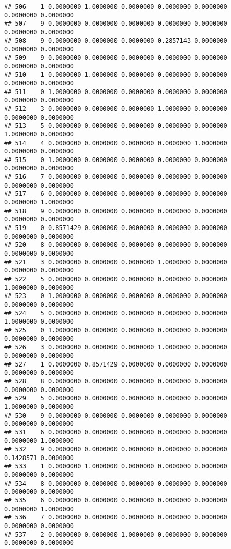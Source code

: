 \documentclass[
]{article}
\begin{document}
\begin{verbatim}
## 506    1 0.0000000 1.0000000 0.0000000 0.0000000 0.0000000 0.0000000 0.0000000
## 507    9 0.0000000 0.0000000 0.0000000 0.0000000 0.0000000 0.0000000 0.0000000
## 508    9 0.0000000 0.0000000 0.0000000 0.2857143 0.0000000 0.0000000 0.0000000
## 509    9 0.0000000 0.0000000 0.0000000 0.0000000 0.0000000 0.0000000 0.0000000
## 510    1 0.0000000 1.0000000 0.0000000 0.0000000 0.0000000 0.0000000 0.0000000
## 511    0 1.0000000 0.0000000 0.0000000 0.0000000 0.0000000 0.0000000 0.0000000
## 512    3 0.0000000 0.0000000 0.0000000 1.0000000 0.0000000 0.0000000 0.0000000
## 513    5 0.0000000 0.0000000 0.0000000 0.0000000 0.0000000 1.0000000 0.0000000
## 514    4 0.0000000 0.0000000 0.0000000 0.0000000 1.0000000 0.0000000 0.0000000
## 515    0 1.0000000 0.0000000 0.0000000 0.0000000 0.0000000 0.0000000 0.0000000
## 516    7 0.0000000 0.0000000 0.0000000 0.0000000 0.0000000 0.0000000 0.0000000
## 517    6 0.0000000 0.0000000 0.0000000 0.0000000 0.0000000 0.0000000 1.0000000
## 518    9 0.0000000 0.0000000 0.0000000 0.0000000 0.0000000 0.0000000 0.0000000
## 519    0 0.8571429 0.0000000 0.0000000 0.0000000 0.0000000 0.0000000 0.0000000
## 520    8 0.0000000 0.0000000 0.0000000 0.0000000 0.0000000 0.0000000 0.0000000
## 521    3 0.0000000 0.0000000 0.0000000 1.0000000 0.0000000 0.0000000 0.0000000
## 522    5 0.0000000 0.0000000 0.0000000 0.0000000 0.0000000 1.0000000 0.0000000
## 523    0 1.0000000 0.0000000 0.0000000 0.0000000 0.0000000 0.0000000 0.0000000
## 524    5 0.0000000 0.0000000 0.0000000 0.0000000 0.0000000 1.0000000 0.0000000
## 525    0 1.0000000 0.0000000 0.0000000 0.0000000 0.0000000 0.0000000 0.0000000
## 526    3 0.0000000 0.0000000 0.0000000 1.0000000 0.0000000 0.0000000 0.0000000
## 527    1 0.0000000 0.8571429 0.0000000 0.0000000 0.0000000 0.0000000 0.0000000
## 528    8 0.0000000 0.0000000 0.0000000 0.0000000 0.0000000 0.0000000 0.0000000
## 529    5 0.0000000 0.0000000 0.0000000 0.0000000 0.0000000 1.0000000 0.0000000
## 530    9 0.0000000 0.0000000 0.0000000 0.0000000 0.0000000 0.0000000 0.0000000
## 531    6 0.0000000 0.0000000 0.0000000 0.0000000 0.0000000 0.0000000 1.0000000
## 532    9 0.0000000 0.0000000 0.0000000 0.0000000 0.0000000 0.1428571 0.0000000
## 533    1 0.0000000 1.0000000 0.0000000 0.0000000 0.0000000 0.0000000 0.0000000
## 534    8 0.0000000 0.0000000 0.0000000 0.0000000 0.0000000 0.0000000 0.0000000
## 535    6 0.0000000 0.0000000 0.0000000 0.0000000 0.0000000 0.0000000 1.0000000
## 536    7 0.0000000 0.0000000 0.0000000 0.0000000 0.0000000 0.0000000 0.0000000
## 537    2 0.0000000 0.0000000 1.0000000 0.0000000 0.0000000 0.0000000 0.0000000

\end{verbatim}
\end{document}
